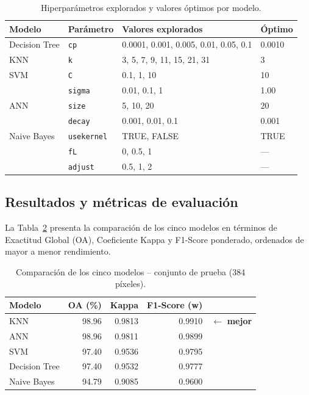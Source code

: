 \documentclass[12pt, letterpaper]{article}
\begin{document}
\begin{table}[H]
  \centering
  \caption{Hiperpar\'ametros explorados y valores \'optimos por modelo.}
  \label{tab:hpo}
  \begin{tabular}{llll}
    \toprule
    \textbf{Modelo} & \textbf{Par\'ametro} & \textbf{Valores explorados} & \textbf{\'Optimo} \\
    \midrule
    Decision Tree & \texttt{cp}        & 0.0001, 0.001, 0.005, 0.01, 0.05, 0.1 & 0.0010 \\
    KNN           & \texttt{k}         & 3, 5, 7, 9, 11, 15, 21, 31             & 3      \\
    SVM           & \texttt{C}         & 0.1, 1, 10                             & 10     \\
                  & \texttt{sigma}     & 0.01, 0.1, 1                           & 1.00   \\
    ANN           & \texttt{size}      & 5, 10, 20                              & 20     \\
                  & \texttt{decay}     & 0.001, 0.01, 0.1                       & 0.001  \\
    Naive Bayes   & \texttt{usekernel} & TRUE, FALSE                            & TRUE   \\
                  & \texttt{fL}        & 0, 0.5, 1                              & ---    \\
                  & \texttt{adjust}    & 0.5, 1, 2                              & ---    \\
    \bottomrule
  \end{tabular}
\end{table}

\subsection*{Resultados y m\'etricas de evaluaci\'on}

La Tabla~\ref{tab:comparacion} presenta la comparaci\'on de los cinco modelos en t\'erminos
de Exactitud Global (OA), Coeficiente Kappa y F1-Score ponderado, ordenados de mayor a
menor rendimiento.

\begin{table}[H]
  \centering
  \caption{Comparaci\'on de los cinco modelos -- conjunto de prueba (384 p\'ixeles).}
  \label{tab:comparacion}
  \begin{tabular}{lrrrl}
    \toprule
    \textbf{Modelo} & \textbf{OA (\%)} & \textbf{Kappa} & \textbf{F1-Score (w)} & \\
    \midrule
    KNN            & 98.96 & 0.9813 & 0.9910 & $\leftarrow$ \textbf{mejor} \\
    ANN            & 98.96 & 0.9811 & 0.9899 & \\
    SVM            & 97.40 & 0.9536 & 0.9795 & \\
    Decision Tree  & 97.40 & 0.9532 & 0.9777 & \\
    Naive Bayes    & 94.79 & 0.9085 & 0.9600 & \\
    \bottomrule
  \end{tabular}
\end{table}
\end{document}

